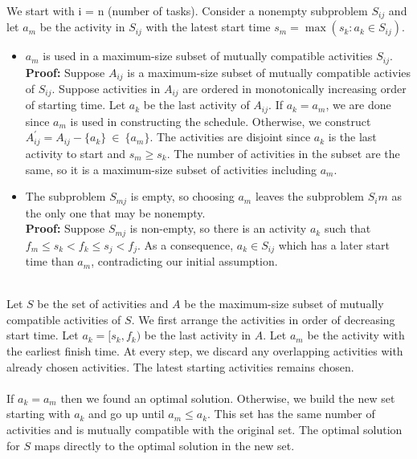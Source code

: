 \documentclass[11pt]{article}
\begin{document}
\begin{enumerate}
    \\ We start with i = n (number of tasks). Consider a nonempty subproblem $S_{ij}$ and let $a_m$ be the activity in $S_{ij}$ with the latest start time $s_m = \max(s_k : a_k \in S_{ij})$.
    \begin{itemize}
        \item $a_m$ is used in a maximum-size subset of mutually compatible activities $S_{ij}$.
        \\ \textbf{Proof: } Suppose $A_{ij}$ is a maximum-size subset of mutually compatible activies of $S_{ij}$. Suppose activities in $A_{ij}$ are ordered in monotonically increasing order of starting time. Let $a_k$ be the last activity of $A_{ij}$. If $a_k = a_m$, we are done since $a_m$ is used in constructing the schedule. Otherwise, we construct $A^{'}_{ij} = A_{ij} - \{a_k\}\ \in \ \{a_m\}$. The activities are disjoint since $a_k$ is the last activity to start and $s_m \geq s_k$. The number of activities in the subset are the same, so it is a maximum-size subset of activities including $a_m$.
        \item The subproblem $S_{mj}$ is empty, so choosing $a_m$ leaves the subproblem $S_im$ as the only one that may be nonempty.
        \\ \textbf{Proof: } Suppose $S_{mj}$ is non-empty, so there is an activity $a_k$ such that $f_m \leq s_k < f_k \leq s_j < f_j$. As a consequence, $a_k \in S_{ij}$ which has a later start time than $a_m$, contradicting our initial assumption.
    \end{itemize}
    \\ Let $S$ be the set of activities and $A$ be the maximum-size subset of mutually compatible activities of $S$. We first arrange the activities in order of decreasing start time. Let $a_k = [s_k, f_k)$ be the last activity in $A$. Let $a_m$ be the activity with the earliest finish time. At every step, we discard any overlapping activities with already chosen activities. The latest starting activities remains chosen.
    \\\\ If $a_k = a_m$ then we found an optimal solution. Otherwise, we build the new set starting with $a_k$ and go up until $a_m \leq a_k$. This set has the same number of activities and is mutually compatible with the original set. The optimal solution for $S$ maps directly to the optimal solution in the new set.    


\end{enumerate}
\end{document}

